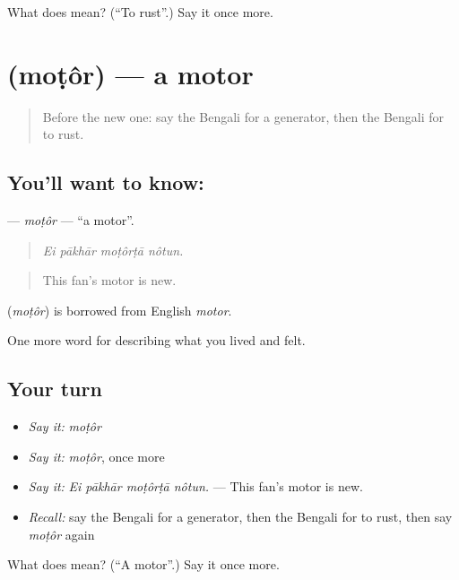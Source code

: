 \begin{tcolorbox}[breakable,colback=teal!4,colframe=teal!35!black,title={Before you move on}]
What does   mean? (\textquotedblleft{}To rust\textquotedblright{}.) Say it once more.
\end{tcolorbox}
\section[\texorpdfstring{\bn{মোটর} (moṭôr)}{মোটর (moṭôr)}]{ (moṭôr) — a motor}

\label{lesson:BN-C504-motor}



\begin{quote}
Before the new one: say the Bengali for a generator, then the Bengali for to rust.
\end{quote}

\subsection*{You'll want to know: }
\textbf{} — \emph{moṭôr} — \textquotedblleft{}a motor\textquotedblright{}.

\begin{quote}
   
\end{quote}

\begin{quote}
\emph{Ei pākhār moṭôrṭā nôtun.}
\end{quote}

\begin{quote}
This fan's motor is new.
\end{quote}

\begin{cousinweb}
\textbf{} (\emph{moṭôr}) is borrowed from English \emph{motor}.
\end{cousinweb}

\begin{grammarlens}[title={What you've built}]
One more word for describing what you lived and felt.
\end{grammarlens}

\subsection*{Your turn}
\begin{itemize}
\raggedright
  \item \emph{Say it:} \emph{moṭôr}
  \item \emph{Say it:} \emph{moṭôr}, once more
  \item \emph{Say it:} \emph{Ei pākhār moṭôrṭā nôtun.} — This fan's motor is new.
  \item \emph{Recall:} say the Bengali for a generator, then the Bengali for to rust, then say \emph{moṭôr} again
\end{itemize}

\begin{tcolorbox}[breakable,colback=teal!4,colframe=teal!35!black,title={Before you move on}]
What does  mean? (\textquotedblleft{}A motor\textquotedblright{}.) Say it once more.
\end{tcolorbox}
